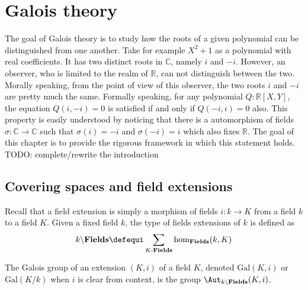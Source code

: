 \chapter{Galois theory}%
\label{chap:galois-theory}%

The goal of Galois theory is to study how the roots of a given polynomial can
be distinguished from one another. Take for example $X^2+1$ as a polynomial
with real coefficients. It has two distinct roots in $\mathbb C$, namely $i$
and $-i$. However, an observer, who is limited to the realm of $\mathbb R$,
can not distinguish between the two. Morally speaking, from the point of view
of this observer, the two roots $i$ and $-i$ are pretty much the same. Formally
speaking, for any polynomial $Q: \mathbb R[X,Y]$, the equation $Q(i,-i) = 0$ is
satisfied if and only if $Q(-i,i) = 0$ also. This property is easily understood
by noticing that there is a automorphism of fields $\sigma: \mathbb C  \to
\mathbb C$ such that $\sigma(i) = -i$ and $\sigma(-i) = i$ which also fixes
$\mathbb R$. The goal of this chapter is to provide the rigorous framework in
which this statement holds.
{\color{red} TODO: complete/rewrite the introduction}

\section{Covering spaces and field extensions}
\label{sec:cover-spac-fields}

\def\fieldstype{\mathbf{Fields}}%
\def\Gal{\mathrm{Gal}}%
\def\fieldshom{\hom_{\fieldstype}}%
\def\isHom{\mathrm{isHom}}%
\def\iso{\mathrm{Iso}}%
\newcommand\restr[1]{{{#1}^\ast}}%
\newcommand\fieldsext[1]{#1\backslash\fieldstype}%
Recall that a field extension is simply a morphism of fields $i: k\to K$ from a
field $k$ to a field $K$. Given a fixed field $k$, the type of fields
extensions of $k$ is defined as
\begin{displaymath}
  \fieldsext k \defequi \sum_{K:\fieldstype}\fieldshom(k,K)
\end{displaymath}

\begin{definition}
  The Galois group of an extension $(K,i)$ of a field $K$, denoted $\Gal(K,i)$
  or $\Gal(K/k)$ when $i$ is clear from context, is the group
  $\Aut_{\fieldsext k}{(K,i)}$.
  \label{def:galois-group}
\end{definition}

